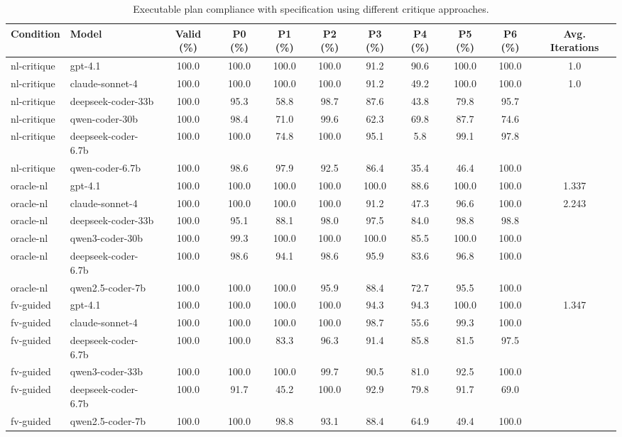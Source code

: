 
\begin{table}[]
    \centering
    \caption{Executable plan compliance with specification using different critique approaches.}\label{tab:plan_convergence}
    \footnotesize
    \begin{tabular}{llccccccccc}
    \toprule
    Condition & Model & Valid (\%) & P0 (\%) & P1 (\%) & P2 (\%) & P3 (\%) & P4 (\%) & P5 (\%) & P6 (\%) & Avg. Iterations
    \\
    \midrule
    nl-critique & gpt-4.1 & 100.0 & 100.0 & 100.0 & 100.0 & 91.2 & 90.6 & 100.0 & 100.0 & 1.0
    \\
    nl-critique & claude-sonnet-4 & 100.0 & 100.0 & 100.0 & 100.0 & 91.2 & 49.2 & 100.0 & 100.0 & 1.0
    \\
    nl-critique & deepseek-coder-33b & 100.0 & 95.3 & 58.8 & 98.7 & 87.6 & 43.8 & 79.8 & 95.7
    \\
    nl-critique & qwen-coder-30b & 100.0 & 98.4 & 71.0 & 99.6 & 62.3 & 69.8 & 87.7 & 74.6
    \\
    nl-critique & deepseek-coder-6.7b & 100.0 & 100.0 & 74.8 & 100.0 & 95.1 & 5.8 & 99.1 & 97.8
    \\
    nl-critique & qwen-coder-6.7b & 100.0 & 98.6 & 97.9 & 92.5 & 86.4 & 35.4 & 46.4 & 100.0
    \\
    \midrule
    oracle-nl & gpt-4.1 & 100.0 & 100.0 & 100.0 & 100.0 & 100.0 & 88.6 & 100.0 & 100.0 & 1.337
    \\
    oracle-nl & claude-sonnet-4 & 100.0 & 100.0 & 100.0 & 100.0 & 91.2 & 47.3 & 96.6 & 100.0 & 2.243
    \\
    oracle-nl & deepseek-coder-33b & 100.0 & 95.1 & 88.1 & 98.0 & 97.5 & 84.0 & 98.8 & 98.8
    \\
    oracle-nl & qwen3-coder-30b & 100.0 & 99.3 & 100.0 & 100.0 & 100.0 & 85.5 & 100.0 & 100.0
    \\
    oracle-nl & deepseek-coder-6.7b & 100.0 & 98.6 & 94.1 & 98.6 & 95.9 & 83.6 & 96.8 & 100.0
    \\
    oracle-nl & qwen2.5-coder-7b & 100.0 & 100.0 & 100.0 & 95.9 & 88.4 & 72.7 & 95.5 & 100.0
    \\
    \midrule
    fv-guided & gpt-4.1 & 100.0 & 100.0 & 100.0 & 100.0 & 94.3 & 94.3 & 100.0 & 100.0 & 1.347
    \\
    fv-guided & claude-sonnet-4 & 100.0 & 100.0 & 100.0 & 100.0 & 98.7 & 55.6 & 99.3 & 100.0
    \\
    fv-guided & deepseek-coder-6.7b & 100.0 & 100.0 & 83.3 & 96.3 & 91.4 & 85.8 & 81.5 & 97.5
    \\
    fv-guided & qwen3-coder-33b & 100.0 & 100.0 & 100.0 & 99.7 & 90.5 & 81.0 & 92.5 & 100.0
    \\
    fv-guided & deepseek-coder-6.7b & 100.0 & 91.7 & 45.2 & 100.0 & 92.9 & 79.8 & 91.7 & 69.0
    \\
    fv-guided & qwen2.5-coder-7b & 100.0 & 100.0 & 98.8 & 93.1 & 88.4 & 64.9 & 49.4 & 100.0
    \\
    \bottomrule
    \end{tabular}
    \normalsize
\end{table}